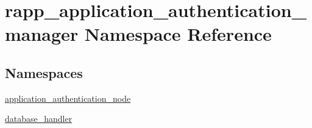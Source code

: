 \hypertarget{namespacerapp__application__authentication__manager}{\section{rapp\-\_\-application\-\_\-authentication\-\_\-manager Namespace Reference}
\label{namespacerapp__application__authentication__manager}
}
\subsection*{Namespaces}
\begin{DoxyCompactItemize}
\item 
\hyperlink{namespacerapp__application__authentication__manager_1_1application__authentication__node}{application\-\_\-authentication\-\_\-node}
\item 
\hyperlink{namespacerapp__application__authentication__manager_1_1database__handler}{database\-\_\-handler}
\end{DoxyCompactItemize}
